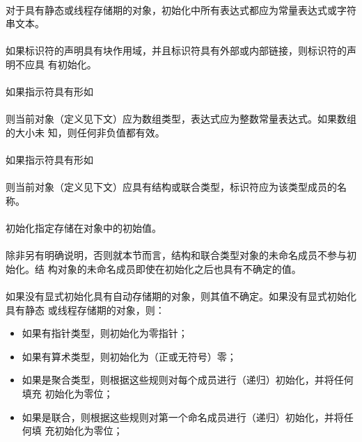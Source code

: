 {\paragraph{}
对于具有静态或线程存储期的对象，初始化中所有表达式都应为常量表达式或字符串文本。

\paragraph{}
如果标识符的声明具有块作用域，并且标识符具有外部或内部链接，则标识符的声明不应具
有初始化。

\paragraph{}
如果指示符具有形如                                                            \\
\mbox{\hspace{4em}\tm{[}  \tm{]}}                     \\
则当前对象（定义见下文）应为数组类型，表达式应为整数常量表达式。如果数组的大小未
知，则任何非负值都有效。

\paragraph{}
如果指示符具有形如                                                            \\
\mbox{\hspace{4em} }                                     \\
则当前对象（定义见下文）应具有结构或联合类型，标识符应为该类型成员的名称。

\semantic
\paragraph{}
初始化指定存储在对象中的初始值。

\paragraph{}
除非另有明确说明，否则就本节而言，结构和联合类型对象的未命名成员不参与初始化。结
构对象的未命名成员即使在初始化之后也具有不确定的值。

\paragraph{}
如果没有显式初始化具有自动存储期的对象，则其值不确定。如果没有显式初始化具有静态
或线程存储期的对象，则：
\begin{itemize}
  \item{如果有指针类型，则初始化为零指针；}
  \item{如果有算术类型，则初始化为（正或无符号）零；}
  \item{如果是聚合类型，则根据这些规则对每个成员进行（递归）初始化，并将任何填充
    初始化为零位；}
  \item{如果是联合，则根据这些规则对第一个命名成员进行（递归）初始化，并将任何填
    充初始化为零位；}
\end{itemize}

}

